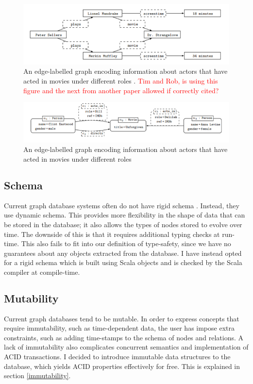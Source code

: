 \documentclass[12pt,a4paper,twoside,openright]{report}
\newcommand\todo[1]{\textcolor{red}{#1}}
\begin{document}
\begin{figure}[ht]
\centering
  \includegraphics[width=\textwidth]{figs/ELGraph.png}
  \caption{An edge-labelled graph encoding information about actors that have acted in movies under different
roles \cite{ELGraphExample}. \todo{Tim and Rob, is using this figure and the next from another paper allowed if correctly cited?}}
  \label{fig:ELGraph}
\end{figure}

\begin{figure}[ht]
\centering
  \includegraphics[width=\textwidth]{figs/PropertyGraph.png}
  \caption{An edge-labelled graph encoding information about actors that have acted in movies under different
roles \cite{PropertyGraphExample}}
  \label{fig:PropertyGraph}
\end{figure}

\subsection{Schema}
Current graph database systems often do not have rigid schema \cite{QueryLanguageSchema}. Instead, they use dynamic schema. This provides more flexibility in the shape of data that can be stored in the database; it also allows the types of nodes stored to evolve over time. The downside of this is that it requires additional typing checks at run-time. This also fails to fit into our definition of type-safety, since we have no guarantees about any objects extracted from the database. I have instead opted for a rigid schema which is built using Scala objects and is checked by the Scala compiler at compile-time.

\subsection{Mutability}
Current graph databases tend to be mutable. In order to express concepts that require immutability, such as time-dependent data, the user has impose extra constraints, such as adding time-stamps to the schema of  nodes and relations. A lack of immutability also complicates concurrent semantics and implementation of ACID transactions. I decided to introduce immutable data structures  to the database, which yields ACID properties effectively for free. This is explained in section \ref{immutability}.
\end{document}
